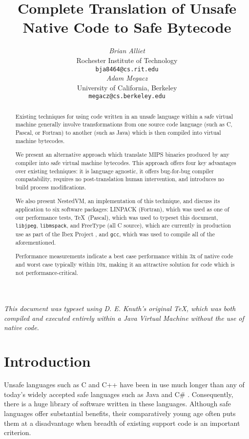 \documentclass{acmconf}
\title{\textbf{\textsf{
Complete Translation of Unsafe Native Code to Safe Bytecode
}}}
\date{}
\author{\begin{tabular}{@{}c@{}}
        {\em {Brian Alliet}} \\
        {Rochester Institute of Technology}\\
        {\tt bja8464@cs.rit.edu}
   \end{tabular}\hskip 1in\begin{tabular}{@{}c@{}}
        {\em {Adam Megacz}} \\
        {University of California, Berkeley} \\
        {\tt megacz@cs.berkeley.edu}
\end{tabular}}
\begin{document}
\maketitle

{\it This document was typeset using D. E. Knuth's original \TeX ,
     which was both compiled and executed entirely within a Java
     Virtual Machine without the use of native code.}

\begin{abstract}

Existing techniques for using code written in an unsafe language
within a safe virtual machine generally involve transformations from
one source code language (such as C, Pascal, or Fortran) to another
(such as Java) which is then compiled into virtual machine bytecodes.

We present an alternative approach which translate MIPS binaries
produced by any compiler into safe virtual machine bytecodes.  This
approach offers four key advantages over existing techniques: it is
language agnostic, it offers bug-for-bug compiler compatability,
requires no post-translation human intervention, and introduces no
build process modifications.

We also present NestedVM, an implementation of this technique, and
discuss its application to six software packages: LINPACK (Fortran),
which was used as one of our performance tests, \TeX\ (Pascal), which
was used to typeset this document, {\tt libjpeg}, {\tt libmspack}, and
FreeType (all C source), which are currently in production use as part
of the Ibex Project \cite{ibex}, and {\tt gcc}, which was used to
compile all of the aforementioned.

Performance measurements indicate a best case performance within 3x of
native code and worst case typically within 10x, making it an
attractive solution for code which is not performance-critical.

\end{abstract}

\section{Introduction}

Unsafe languages such as C \cite{KR} and C++ \cite{soustroup} have
been in use much longer than any of today's widely accepted safe
languages such as Java \cite{java} and C\# \cite{csharp}.
Consequently, there is a huge library of software written in these
languages.  Although safe languages offer substantial benefits, their
comparatively young age often puts them at a disadvantage when breadth
of existing support code is an important criterion.
\end{document}

